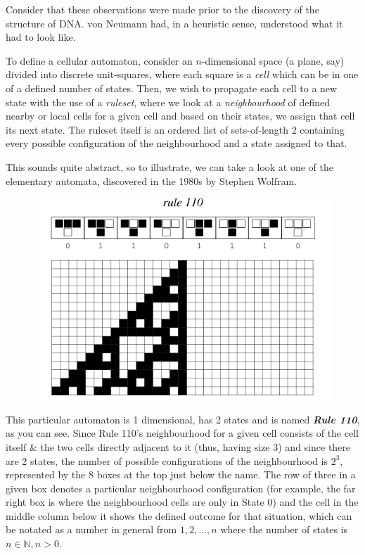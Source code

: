Consider that these observations were made prior to the discovery of the
structure of DNA. von Neumann had, in a heuristic sense, understood what
it had to look like.

To define a cellular automaton, consider an \(n\)-dimensional space (a
plane, say) divided into discrete unit-squares, where each square is a
\emph{cell} which can be in one of a defined number of states. Then, we
wish to propagate each cell to a new state with the use of a
\emph{ruleset}, where we look at a \emph{neighbourhood} of defined
nearby or local cells for a given cell and based on their states, we
assign that cell its next state. The ruleset itself is an ordered list
of sets-of-length 2 containing every possible configuration of the
neighbourhood and a state assigned to that.

This sounds quite abstract, so to illustrate, we can take a look at one
of the elementary automata, discovered in the 1980s by Stephen Wolfram.

\begin{figure}[htbp]
\centering
\includegraphics{image_0.png}
\caption{}
\end{figure}

This particular automaton is 1 dimensional, has 2 states and is named
\textbf{\emph{Rule 110}}, as you can see. Since Rule 110's neighbourhood
for a given cell consists of the cell itself \& the two cells directly
adjacent to it (thus, having size 3) and since there are 2 states, the
number of possible configurations of the neighbourhood is \(2^3\),
represented by the 8 boxes at the top just below the name. The row of
three in a given box denotes a particular neighbourhood configuration
(for example, the far right box is where the neighbourhood cells are
only in State 0) and the cell in the middle column below it shows the
defined outcome for that situation, which can be notated as a number in
general from \(1,2,…,n\) where the number of states is
\(n∈\mathbb{N},n>0\).

